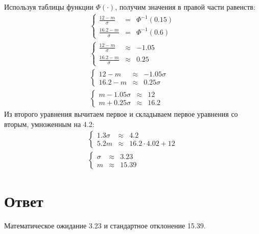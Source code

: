 \documentclass[12pt,a4paper]{article}
\begin{document}
    Используя таблицы функции $\Phi(\cdot)$, получим значения в правой части равенств:
    \begin{gather}
        \left \{
        \begin{array}{lcl}
            \frac{12-m}{\sigma}   & = & \Phi^{-1} \left (  0.15 \right ) \\
            \frac{16.2-m}{\sigma} & = & \Phi^{-1} \left ( 0.6 \right )
        \end{array}
        \right . \\
        \left \{
        \begin{array}{lcl}
            \frac{12-m}{\sigma}   & \approx & -1.05 \\
            \frac{16.2-m}{\sigma} & \approx & 0.25
        \end{array}
        \right . \\
        \left \{
        \begin{array}{lcl}
            12 - m   & \approx & -1.05 \sigma \\
            16.2 - m & \approx & 0.25 \sigma
        \end{array}
        \right . \\
        \left \{
        \begin{array}{lcl}
            m - 1.05 \sigma & \approx & 12   \\
            m + 0.25 \sigma & \approx & 16.2
        \end{array}
        \right .
    \end{gather}
    Из второго уравнения вычитаем первое и складываем первое уравнения со вторым, умноженным на 4.2:
    \begin{gather}
        \left \{
        \begin{array}{lcl}
            1.3 \sigma & \approx & 4.2                  \\
            5.2 m      & \approx & 16.2 \cdot 4.02 + 12
        \end{array}
        \right . \\
        \left \{
        \begin{array}{lcl}
            \sigma & \approx & 3.23  \\
            m      & \approx & 15.39
        \end{array}
        \right .
    \end{gather}

    \section*{Ответ}
    Математическое ожидание 3.23 и стандартное отклонение 15.39.
\end{document}
